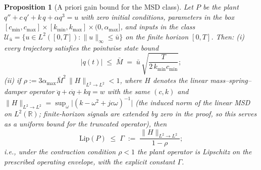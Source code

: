 \documentclass[11pt,sagev,times]{sagej}
\newtheorem{proposition}{Proposition}
\newcommand{\Ltwo}{L^2}
\begin{document}
\begin{proposition}[A priori gain bound for the MSD class]\label{prop:apriori}
Let $P$ be the plant $q''+c\,q'+k\,q+\alpha q^3=u$ with zero initial
conditions, parameters in the box
$[c_{\min},c_{\max}]\times[k_{\min},k_{\max}]\times(0,\alpha_{\max}]$, and
inputs in the class
$\mathcal{U}_{\bar u}=\{u\in\Ltwo([0,T]):\|u\|_\infty\le\bar u\}$ on the
finite horizon $[0,T]$. Then:
(i) every trajectory satisfies the pointwise state bound
\begin{equation}
  |q(t)| \;\le\; \bar M \;=\; \bar u\,\sqrt{\frac{T}{2\,k_{\min}c_{\min}}};
  \label{eq:Mbar}
\end{equation}
(ii) if
$\rho:=3\alpha_{\max}\bar M^2\,\|H\|_{\Ltwo\to\Ltwo}<1$, where $H$ denotes
the linear mass--spring--damper operator $\ddot q+c\dot q+kq=w$ with the
same $(c,k)$ and
$\|H\|_{\Ltwo\to\Ltwo}=\sup_\omega\big|(k-\omega^2+jc\omega)^{-1}\big|$
(the induced norm of the linear MSD on $L^2(\mathbb{R})$; finite-horizon
signals are extended by zero in the proof, so this serves as a uniform
bound for the truncated operator),
then
\begin{equation}
  \mathrm{Lip}(P)\;\le\;\Gamma \;:=\;
  \frac{\|H\|_{\Ltwo\to\Ltwo}}{1-\rho};
  \label{eq:Gamma}
\end{equation}
i.e., under the contraction condition $\rho<1$ the plant operator is
Lipschitz on the prescribed operating envelope, with the explicit constant
$\Gamma$.
\end{proposition}
\end{document}
